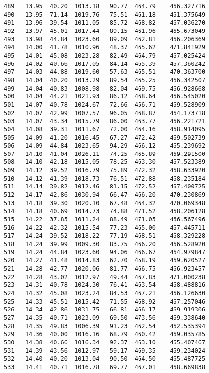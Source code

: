 \documentclass[11pt]{article}
\begin{document}
\begin{tcolorbox}[breakable, size=fbox, boxrule=.5pt, pad at break*=1mm, opacityfill=0]
\begin{Verbatim}[commandchars=\\\{\}]
489   13.95  40.20  1013.18   90.77  464.79    466.327716
490   13.95  71.14  1019.76   75.51  461.18    461.375649
491   13.96  39.54  1011.05   85.72  468.82    467.036270
492   13.97  45.01  1017.44   89.15  461.96    465.673049
493   13.98  44.84  1023.60   89.09  462.81    466.206369
494   14.00  41.78  1010.96   48.37  465.62    471.841929
495   14.01  45.08  1023.28   82.49  464.79    467.025424
496   14.02  40.66  1017.05   84.14  465.39    467.360242
497   14.03  44.88  1019.60   57.63  465.51    470.363700
498   14.04  40.20  1013.29   89.54  465.25    466.342507
499   14.04  40.83  1008.98   82.04  469.75    466.928668
500   14.04  44.21  1021.93   86.12  468.64    466.545020
501   14.07  40.78  1024.67   72.66  456.71    469.528909
502   14.07  42.99  1007.57   96.05  468.87    464.173718
503   14.07  43.34  1015.79   86.00  463.77    466.221721
504   14.08  39.31  1011.67   72.00  464.16    468.914095
505   14.09  41.20  1016.45   67.27  472.42    469.502739
506   14.09  44.84  1023.65   94.29  466.12    465.239692
507   14.10  41.04  1026.11   74.25  465.89    469.291500
508   14.10  42.18  1015.05   78.25  463.30    467.523389
509   14.12  39.52  1016.79   75.89  472.32    468.633920
510   14.12  41.39  1018.73   76.51  472.88    468.235184
511   14.14  39.82  1012.46   81.15  472.52    467.400725
512   14.17  42.86  1030.94   66.47  466.20    470.230869
513   14.18  39.30  1020.10   67.48  464.32    470.069348
514   14.18  40.69  1014.73   74.88  471.52    468.206128
515   14.22  37.85  1011.24   88.49  471.05    466.567496
516   14.22  42.32  1015.54   77.23  465.00    467.445711
517   14.24  39.52  1018.22   77.19  468.51    468.329228
518   14.24  39.99  1009.30   83.75  466.20    466.528920
519   14.24  44.84  1023.60   94.06  466.67    464.979847
520   14.27  41.48  1014.83   62.70  458.19    469.620527
521   14.28  42.77  1020.06   81.77  466.75    466.923457
522   14.28  43.02  1012.97   49.44  467.83    471.000238
523   14.31  40.78  1024.30   76.41  463.54    468.488816
524   14.32  45.08  1023.24   84.53  467.21    466.126630
525   14.33  45.51  1015.42   71.55  468.92    467.257046
526   14.34  42.86  1031.75   66.81  466.17    469.919306
527   14.35  40.71  1023.09   69.50  473.56    469.338640
528   14.35  49.83  1006.39   91.23  462.54    462.535394
529   14.36  40.00  1016.16   68.79  460.42    469.035785
530   14.38  40.66  1016.34   92.37  463.10    465.407467
531   14.39  43.56  1012.97   59.17  469.35    469.234024
532   14.40  40.20  1013.04   90.50  464.50    465.487725
533   14.41  40.71  1016.78   69.77  467.01    468.669838

\end{Verbatim}
\end{tcolorbox}
\end{document}
